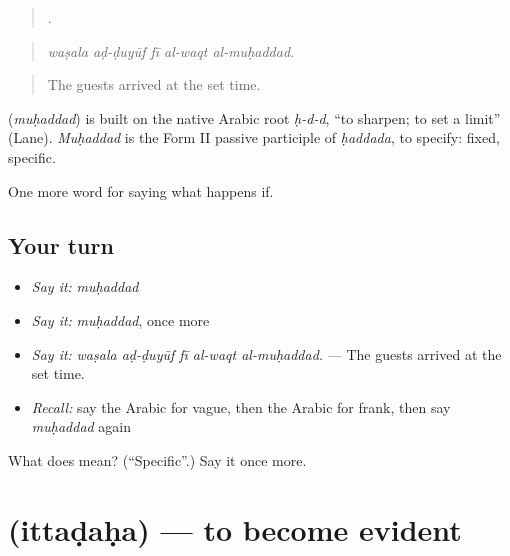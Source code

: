 \begin{quote}
    .
\end{quote}

\begin{quote}
\emph{waṣala aḍ-ḍuyūf fī al-waqt al-muḥaddad.}
\end{quote}

\begin{quote}
The guests arrived at the set time.
\end{quote}

\begin{cousinweb}
\textbf{} (\emph{muḥaddad}) is built on the native Arabic root \emph{ḥ-d-d}, \textquotedblleft{}to sharpen; to set a limit\textquotedblright{} (Lane). \emph{Muḥaddad} is the Form II passive participle of \emph{ḥaddada}, to specify: fixed, specific.
\end{cousinweb}

\begin{grammarlens}[title={What you've built}]
One more word for saying what happens if.
\end{grammarlens}

\subsection*{Your turn}
\begin{itemize}
\raggedright
  \item \emph{Say it:} \emph{muḥaddad}
  \item \emph{Say it:} \emph{muḥaddad}, once more
  \item \emph{Say it:} \emph{waṣala aḍ-ḍuyūf fī al-waqt al-muḥaddad.} — The guests arrived at the set time.
  \item \emph{Recall:} say the Arabic for vague, then the Arabic for frank, then say \emph{muḥaddad} again
\end{itemize}

\begin{tcolorbox}[breakable,colback=teal!4,colframe=teal!35!black,title={Before you move on}]
What does  mean? (\textquotedblleft{}Specific\textquotedblright{}.) Say it once more.
\end{tcolorbox}
\section[\texorpdfstring{\ar{اتضح} (ittaḍaḥa)}{اتضح (ittaḍaḥa)}]{ (ittaḍaḥa) — to become evident}


